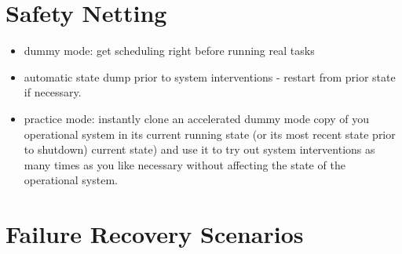 \documentclass[11pt,a4paper]{article}
\begin{document}
\section{Safety Netting}
\label{SafetyNetting}

\begin{itemize}
    \item dummy mode: get scheduling right before running real tasks
    \item automatic state dump prior to system interventions - restart
        from prior state if necessary.
    \item practice mode: instantly clone an accelerated dummy mode copy
        of you operational system in its current running state (or its
        most recent state prior to shutdown) current state) and use it
        to try out system interventions as many times as you like
        necessary without affecting the state of the operational system.
\end{itemize}

\section{Failure Recovery Scenarios}
\label{Failure Recovery Scenarios}
\end{document}
